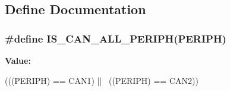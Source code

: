 \subsection{Define Documentation}
\hypertarget{group__CAN__Exported__Types_gaf471a53f52a02078ffd842658d932f63}{
\subsubsection[{IS\_\-CAN\_\-ALL\_\-PERIPH}]{\setlength{\rightskip}{0pt plus 5cm}\#define IS\_\-CAN\_\-ALL\_\-PERIPH(PERIPH)}}
\label{group__CAN__Exported__Types_gaf471a53f52a02078ffd842658d932f63}
{\bfseries Value:}
\begin{DoxyCode}
(((PERIPH) == CAN1) || \
                                   ((PERIPH) == CAN2))
\end{DoxyCode}

